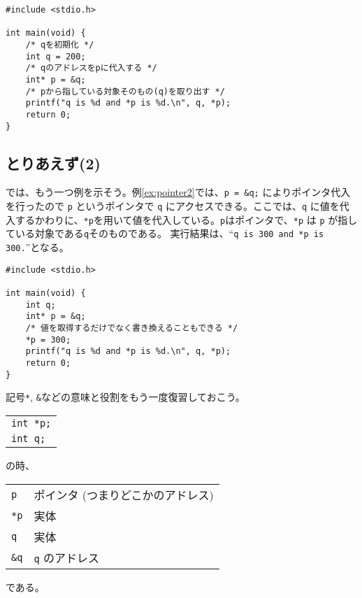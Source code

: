 \begin{reidai}\label{ex:pointer1}
    \begin{verbatim}
#include <stdio.h>

int main(void) {
    /* qを初期化 */
    int q = 200;
    /* qのアドレスをpに代入する */
    int* p = &q;
    /* pから指している対象そのもの(q)を取り出す */
    printf("q is %d and *p is %d.\n", q, *p);
    return 0;
}
\end{verbatim}
\end{reidai}
\begin{figure}[H]
    \centering
\end{figure}

\subsection{とりあえず(2)}
では、もう一つ例を示そう。例\ref{ex:pointer2}では、\texttt{p = \&q;} によりポインタ代入を行ったので \texttt{p} というポインタで \texttt{q} にアクセスできる。ここでは、\texttt{q} に値を代入するかわりに、\texttt{*p}を用いて値を代入している。\texttt{p}はポインタで、\texttt{*p} は \texttt{p} が指している対象である\texttt{q}そのものである。
実行結果は、``\texttt{q is 300 and *p is 300.}''となる。
\begin{reidai}\label{ex:pointer2}
    \begin{verbatim}
#include <stdio.h>

int main(void) {
    int q;
    int* p = &q;
    /* 値を取得するだけでなく書き換えることもできる */
    *p = 300;
    printf("q is %d and *p is %d.\n", q, *p);
    return 0;
}
\end{verbatim}
\end{reidai} \noindent
記号\texttt{*}, \texttt{\&}などの意味と役割をもう一度復習しておこう。
\begin{table}[H]
    \centering
    \begin{tabular}{l}
        \texttt{int *p;} \\
        \texttt{int q;}
    \end{tabular}
\end{table} \noindent
の時、
\begin{table}[H]
    \centering
    \begin{tabular}{ll}
        \texttt{p}   & ポインタ (つまりどこかのアドレス) \\
        \texttt{*p}  & 実体                              \\
        \texttt{q}   & 実体                              \\
        \texttt{\&q} & \texttt{q} のアドレス
    \end{tabular}
\end{table} \noindent
である。

